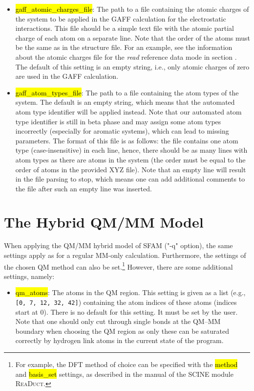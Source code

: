 \documentclass[]{tufte-book}
\begin{document}
{{\begin{itemize}
\item \hl{gaff\_atomic\_charges\_file}: The path to a file containing the atomic charges of the system to be applied in the GAFF calculation for the electrostatic interactions. This file should be a simple text file with the atomic partial charge of each atom on a separate line. Note that the order of the atoms must be the same as in the structure file. For an example, see the information about the atomic charges file for the \textit{read} reference data mode in section . The default of this setting is an empty string, i.e., only atomic charges of zero are used in the GAFF calculation.
\item \hl{gaff\_atom\_types\_file}: The path to a file containing the atom types of the system. The default is an empty string, which means that the automated atom type identifier will be applied instead. Note that our automated atom type identifier is still in beta phase and may assign some atom types incorrectly (especially for aromatic systems), which can lead to missing parameters. The format of this file is as follows: the file contains one atom type (case-insensitive) in each line, hence, there should be as many lines with atom types as there are atoms in the system (the order must be equal to the order of atoms in the provided XYZ file). Note that an empty line will result in the file parsing to stop, which means one can add additional comments to the file after such an empty line was inserted.
\end{itemize}


\chapter{The Hybrid QM/MM Model}\label{ch:qmmm}
\label{sec:qm_mm}

When applying the QM/MM hybrid model of SFAM ("-q" option), the same settings apply as for a regular MM-only calculation. Furthermore, the settings of the chosen QM method can also be set.\footnote{For example, the DFT method of choice can be specified with the \hl{method} and \hl{basis\_set} settings, as described in the manual of the SCINE module \textsc{ReaDuct}.} However, there are some additional settings, namely:

\begin{itemize}
\item \hl{qm\_atoms}: The atoms in the QM region. This setting is given as a list (e.g., \texttt{[0, 7, 12, 32, 42]}) containing the atom indices of these atoms (indices start at 0). There is no default for this setting. It must be set by the user. Note that one should only cut through single bonds at the QM--MM boundary when choosing the QM region as only these can be saturated correctly by hydrogen link atoms in the current state of the program.



\end{itemize}}}
\end{document}

